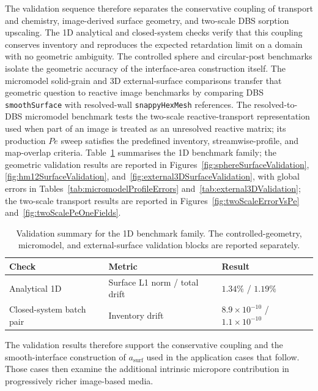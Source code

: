The validation sequence therefore separates the conservative coupling of
transport and chemistry, image-derived surface geometry, and two-scale DBS
sorption upscaling. The 1D analytical and closed-system checks verify that this
coupling conserves inventory and reproduces the expected retardation limit on a
domain with no geometric ambiguity. The controlled
sphere and circular-post benchmarks isolate the geometric accuracy of the
interface-area construction itself. The micromodel solid-grain and 3D
external-surface comparisons transfer that geometric question to reactive image
benchmarks by comparing DBS \texttt{smoothSurface} with resolved-wall
\texttt{snappyHexMesh} references.
The resolved-to-DBS micromodel benchmark tests the two-scale reactive-transport
representation used when part of an image is treated as an unresolved reactive
matrix; its production $Pe$ sweep satisfies the predefined inventory,
streamwise-profile, and map-overlap criteria. Table~\ref{tab:validationSummary} summarises the 1D
benchmark family; the geometric validation results are reported in
Figures~\ref{fig:sphereSurfaceValidation}, \ref{fig:hm12SurfaceValidation},
and~\ref{fig:external3DSurfaceValidation}, with global errors in
Tables~\ref{tab:micromodelProfileErrors} and~\ref{tab:external3DValidation};
the two-scale transport results are reported in
Figures~\ref{fig:twoScaleErrorVsPe} and~\ref{fig:twoScalePeOneFields}.

\begin{table}[htbp]
    \centering
    \caption{Validation summary for the 1D benchmark family. The
    controlled-geometry, micromodel, and external-surface validation blocks are
    reported separately.}
    \label{tab:validationSummary}
    \begin{tabular}{lll}
        \toprule
        Check & Metric & Result \\
        \midrule
        Analytical 1D & Surface L1 norm / total drift & $1.34\%$ / $1.19\%$ \\
        Closed-system batch pair & Inventory drift & $8.9\times10^{-10}$ / $1.1\times10^{-10}$ \\
        \bottomrule
    \end{tabular}
\end{table}

The validation results therefore support the conservative coupling
and the smooth-interface construction of $a_{\mathrm{surf}}$ used in the
application cases that follow. Those cases then examine the additional
intrinsic micropore contribution in progressively richer image-based media.

